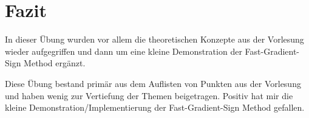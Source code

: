 \documentclass[11pt]{article}
\begin{document}
    \hypertarget{fazit}{%
\section{Fazit}\label{fazit}}

In dieser Übung wurden vor allem die theoretischen Konzepte aus der
Vorlesung wieder aufgegriffen und dann um eine kleine Demonstration der
Fast-Gradient-Sign Method ergänzt.

Diese Übung bestand primär aus dem Auflisten von Punkten aus der
Vorlesung und haben wenig zur Vertiefung der Themen beigetragen. Positiv
hat mir die kleine Demonstration/Implementierung der Fast-Gradient-Sign
Method gefallen.


    
    
    
\end{document}
